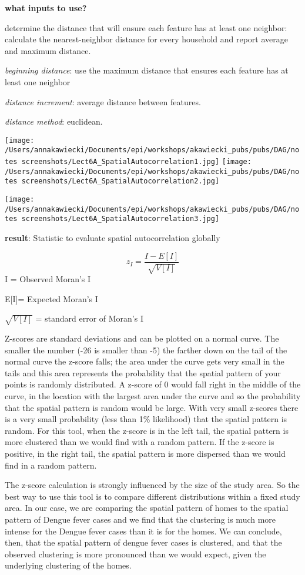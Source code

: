 \documentclass[
]{article}
\begin{document}
\textbf{what inputs to use?}

determine the distance that will ensure each feature has at least one
neighbor: calculate the nearest-neighbor distance for every household
and report average and maximum distance.

\emph{beginning distance}: use the maximum distance that ensures each
feature has at least one neighbor

\emph{distance increment}: average distance between features.

\emph{distance method}: euclidean.

\texttt{[image: /Users/annakawiecki/Documents/epi/workshops/akawiecki\_pubs/pubs/DAG/notes screenshots/Lect6A\_SpatialAutocorrelation1.jpg]}
\texttt{[image: /Users/annakawiecki/Documents/epi/workshops/akawiecki\_pubs/pubs/DAG/notes screenshots/Lect6A\_SpatialAutocorrelation2.jpg]}

\texttt{[image: /Users/annakawiecki/Documents/epi/workshops/akawiecki\_pubs/pubs/DAG/notes screenshots/Lect6A\_SpatialAutocorrelation3.jpg]}

\textbf{result}: Statistic to evaluate spatial autocorrelation globally

\[z_I = \frac{I-E[I]}{\sqrt{V[I]}}\] I = Observed Moran's I

E{[}I{]}= Expected Moran's I

\(\sqrt{V[I]}\) = standard error of Moran's I

Z-scores are standard deviations and can be plotted on a normal curve.
The smaller the number (-26 is smaller than -5) the farther down on the
tail of the normal curve the z-score falls; the area under the curve
gets very small in the tails and this area represents the probability
that the spatial pattern of your points is randomly distributed. A
z-score of 0 would fall right in the middle of the curve, in the
location with the largest area under the curve and so the probability
that the spatial pattern is random would be large. With very small
z-scores there is a very small probability (less than 1\% likelihood)
that the spatial pattern is random. For this tool, when the z-score is
in the left tail, the spatial pattern is more clustered than we would
find with a random pattern. If the z-score is positive, in the right
tail, the spatial pattern is more dispersed than we would find in a
random pattern.

The z-score calculation is strongly influenced by the size of the study
area. So the best way to use this tool is to compare different
distributions within a fixed study area. In our case, we are comparing
the spatial pattern of homes to the spatial pattern of Dengue fever
cases and we find that the clustering is much more intense for the
Dengue fever cases than it is for the homes. We can conclude, then, that
the spatial pattern of dengue fever cases is clustered, and that the
observed clustering is more pronounced than we would expect, given the
underlying clustering of the homes.
\end{document}

